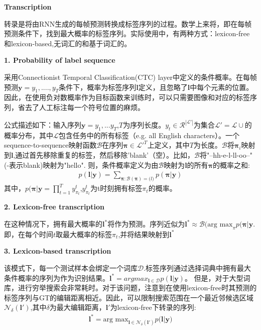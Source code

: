 \documentclass{article}
\begin{document}
\textbf{Transcription}

转录是将由RNN生成的每帧预测转换成标签序列的过程。数学上来将，即在每帧预测条件下，找到最大概率的标签序列。实际使用中，有两种方式：lexicon-free 和lexicon-based,无词汇的和基于词汇的。

\textbf{1. Probability of label sequence}

采用Connectionist Temporal Classification(CTC) layer中定义的条件概率。在每帧预测$\textbf{y}=y_1,....,y_T$条件下，概率为标签序列$\textbf{l}$定义，且忽略了$\textbf{l}$中每个元素的位置。因此，在使用负对数概率作为目标函数来训练时，可以只需要图像和对应的标签序列，省去了人工标注每一个符号位置的麻烦。

公式描述如下：输入序列$\textbf{y}=y_1,...y_T$,$T$为序列长度。$y_t \in \mathcal{R}^{|\mathcal{L}'|}$为集合$\mathcal{L}'=\mathcal{L}\cup$的概率分布，其中$\mathcal{L}$包含任务中的所有标签（e.g. all English characters）。一个sequence-to-sequence映射函数$\mathcal{B}$在序列$\boldsymbol{\pi} \in \mathcal{L}'^T$上定义，其中$T$为长度。$\mathcal{B}$将$\boldsymbol{\pi}_i$映射到$\textbf{l}$,通过首先移除重复的标签，然后移除'blank'（空）。比如，$\mathcal{B}$将"--hh-e-l-ll-oo--"(-表示blank)映射为"hello". 则，条件概率定义为由$\mathcal{B}$映射为$\textbf{l}$的所有$\boldsymbol{\pi}$的概率之和:
\begin{align}
p(\boldsymbol{l}|\textbf{y}) = \sum_{\boldsymbol{\pi}:\mathcal{B}(\boldsymbol{\pi})=\boldsymbol(l)} p(\boldsymbol{\pi}|\textbf{y}) 
\end{align}
其中，$p(\boldsymbol{\pi}|\textbf{y} = \prod_{t=1}^T y_{\pi_t}^t$,$y_{\pi_t}^t$为t时刻拥有标签$\pi_t$的概率。

\textbf{2. Lexicon-free transcription}

在这种情况下，拥有最大概率的$\textbf{l}^*$将作为预测。序列近似为$\textbf{l}^* \approx \mathcal{B}(\text{arg max}_\pi p(\boldsymbol{\pi}|\textbf{y}$.即，在每个时间$t$取最大概率的标签$\pi_t$,并将结果映射到$\textbf{l}^*$

\textbf{3. Lexicon-based transcription}

该模式下，每一个测试样本会绑定一个词库$\mathcal{D}$.标签序列通过选择词典中拥有最大条件概率的序列为作为识别结果。$\textbf{l}^* = arg max_{\textbf{l} \in \mathcal{D}} p(\textbf{l}|\textbf{y})$。
但是，对于大型词库，进行穷举搜索会非常耗时。对于该问题，注意到在使用lexicon-free时其预测的标签序列与GT的编辑距离相近。因此，可以限制搜索范围在一个最近邻候选区域$\mathcal{N}_\delta(\textbf{l}')$,其中$\delta$为最大编辑距离，$\textbf{l}'$为lexicon-free下转录的序列:
\begin{align}
\textbf{l}^* = \text{arg max}_{\textbf{l} \in \mathcal{N}_\delta(\textbf{l}')} p(\textbf{l}| \textbf{y)}
\end{align}
\end{document}
